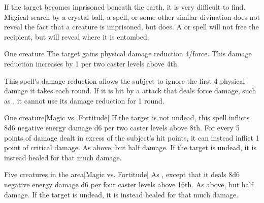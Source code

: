 \spellnotes If the target becomes inprisoned beneath the earth, it is very difficult to find. Magical search by a crystal ball, a  spell, or some other similar divination does not reveal the fact that a creature is imprisoned, but  does. A  or  spell will not free the recipient, but will reveal where it is entombed.

\spellrng{\rngclose}
\spelldur{\durshort}
\begin{spelltarget}{One creature}
    \spelleffect The target gains physical damage reduction 4/force. This damage reduction increases by 1 per two caster levels above 4th.
\end{spelltarget}
\spellnotes This spell's damage reduction allows the subject to ignore the first 4 physical damage it takes each round. If it is hit by a attack that deals force damage, such as , it cannot use its damage reduction for 1 round.

\spellrng{\rngclose}
\begin{spelltarget}{One creature}[Magic vs. Fortitude]
    \spellsuccess If the target is not undead, this spell inflicts 8d6 negative energy damage \add d6 per two caster levels above 8th. For every 5 points of damage dealt in excess of the subject's hit points, it can instead inflict 1 point of critical damage.
    \spellfailure As above, but half damage.
    \spelleffect If the target is undead, it is instead healed for that much damage.
\end{spelltarget}

\begin{spelltargets}{Five creatures in the area}[Magic vs. Fortitude]
    \spellsuccess As , except that it deals 8d6 negative energy damage \add d6 per four caster levels above 16th.
    \spellfailure As above, but half damage.
    \spelleffect If the target is undead, it is instead healed for that much damage.
\end{spelltargets}


